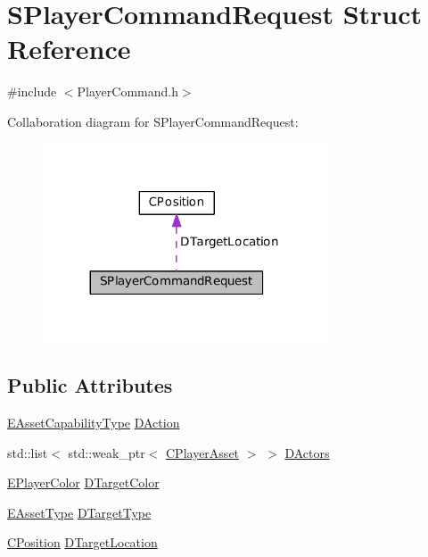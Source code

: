 \hypertarget{structSPlayerCommandRequest}{}\section{S\+Player\+Command\+Request Struct Reference}
\label{structSPlayerCommandRequest}


{\ttfamily \#include $<$Player\+Command.\+h$>$}



Collaboration diagram for S\+Player\+Command\+Request\+:
\nopagebreak
\begin{figure}[H]
\begin{center}
\leavevmode
\includegraphics[width=239pt]{structSPlayerCommandRequest__coll__graph}
\end{center}
\end{figure}
\subsection*{Public Attributes}
\begin{DoxyCompactItemize}
\item 
\hyperlink{GameDataTypes_8h_a35b98ce26aca678b03c6f9f76e4778ce}{E\+Asset\+Capability\+Type} \hyperlink{structSPlayerCommandRequest_a80897bbccf2c4e0b148a7aa815a926c6}{D\+Action}
\item 
std\+::list$<$ std\+::weak\+\_\+ptr$<$ \hyperlink{classCPlayerAsset}{C\+Player\+Asset} $>$ $>$ \hyperlink{structSPlayerCommandRequest_aa37fc01519676345703d78b9f573894a}{D\+Actors}
\item 
\hyperlink{GameDataTypes_8h_aafb0ca75933357ff28a6d7efbdd7602f}{E\+Player\+Color} \hyperlink{structSPlayerCommandRequest_a3690a5117efe6214d92f18d672b5714f}{D\+Target\+Color}
\item 
\hyperlink{GameDataTypes_8h_a5600d4fc433b83300308921974477fec}{E\+Asset\+Type} \hyperlink{structSPlayerCommandRequest_a864e47c641127665751091876a6d3c5e}{D\+Target\+Type}
\item 
\hyperlink{classCPosition}{C\+Position} \hyperlink{structSPlayerCommandRequest_a701702b94ca2fd2738e95ef6711dd41a}{D\+Target\+Location}
\end{DoxyCompactItemize}


